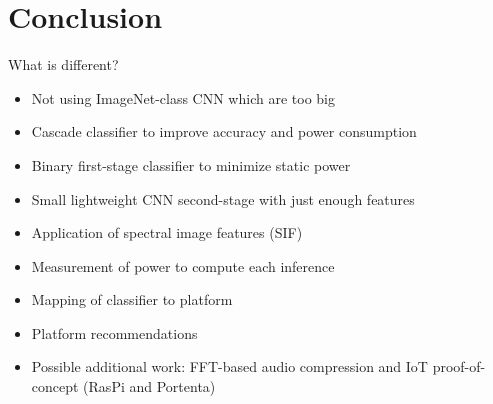 
\chapter{Conclusion}

What is different?

\begin{itemize}
\item Not using ImageNet-class CNN which are too big
\item Cascade classifier to improve accuracy and power consumption
\item Binary first-stage classifier to minimize static power
\item Small lightweight CNN second-stage with just enough features
\item Application of spectral image features (SIF)
\item Measurement of power to compute each inference
\item Mapping of classifier to platform
\item Platform recommendations
\item Possible additional work: FFT-based audio compression and IoT proof-of-concept (RasPi and Portenta)
\end{itemize}